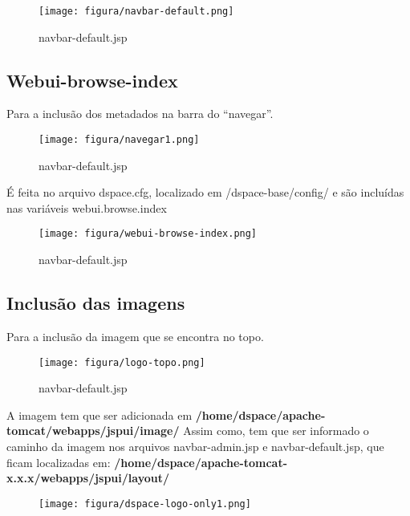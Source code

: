 \documentclass[12pt,hidelinks]{article}
\begin{document}
\begin{figure}[!htp]
                \centering
                \texttt{[image: figura/navbar-default.png]}
                \caption{navbar-default.jsp}
            \label{Rotulo}
        \end{figure}

\newpage  

\subsection{Webui-browse-index}

Para a inclusão dos metadados na barra do “navegar”. 

    \begin{figure}[!htp]
        \centering
        \texttt{[image: figura/navegar1.png]}
        \caption{navbar-default.jsp}
        \label{Rotulo}
     \end{figure}



É feita no arquivo dspace.cfg, localizado em /dspace-base/config/ e são incluídas nas variáveis webui.browse.index


    \begin{figure}[!htp]
        \centering
        \texttt{[image: figura/webui-browse-index.png]}
        \caption{navbar-default.jsp}
        \label{Rotulo}
    \end{figure}
 
\newpage
\subsection{Inclusão das imagens}
       
Para a inclusão da imagem que se encontra no topo.

\begin{figure}[!htp]
        \centering
        \texttt{[image: figura/logo-topo.png]}
        \caption{navbar-default.jsp}
        \label{Rotulo}
    \end{figure}
    
A imagem tem que ser adicionada em \textbf{/home/dspace/apache-tomcat/webapps/jspui/image/}  
\singlespacing
Assim como, tem que ser informado o caminho da imagem nos arquivos navbar-admin.jsp e navbar-default.jsp, que ficam localizadas em: \textbf{/home/dspace/apache-tomcat-x.x.x/webapps/jspui/layout/}  

\begin{figure}[!htp]
        \centering
        \texttt{[image: figura/dspace-logo-only1.png]}
        \label{Rotulo}
    \end{figure}
    
\end{document}
